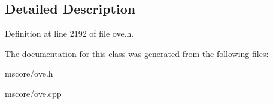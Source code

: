 \subsection{Detailed Description}


Definition at line 2192 of file ove.\+h.



The documentation for this class was generated from the following files\+:\begin{DoxyCompactItemize}
\item 
mscore/ove.\+h\item 
mscore/ove.\+cpp\end{DoxyCompactItemize}
